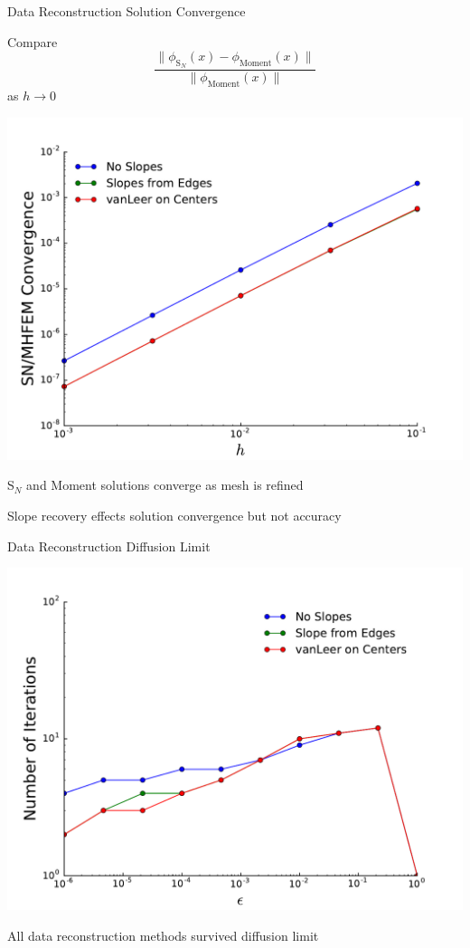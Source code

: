 \documentclass[10pt]{beamer}
\newcommand{\SN}{S$_N$\xspace}
\begin{document}
\begin{frame}{Data Reconstruction Solution Convergence}

	Compare 
	\begin{equation*}
		\frac{\| \phi_{\text{S}_N}(x) - 
			\phi_\text{Moment}(x)\|}{\|\phi_\text{Moment}(x) \|}
	\end{equation*}
	as $h\rightarrow 0$ 

	\pause
	\centerline{\includegraphics[width=.5\paperwidth]{figs/hlim.pdf}}

	\pause
	\SN and Moment solutions converge as mesh is refined 

	\pause Slope recovery effects solution convergence but not accuracy 

\end{frame}

\begin{frame}{Data Reconstruction Diffusion Limit}

	\centerline{\includegraphics[width=.6\paperwidth]{figs/perm_dl.pdf}}

	\vfill
	\centerline{All data reconstruction methods survived diffusion limit}

\end{frame}
\end{document}
